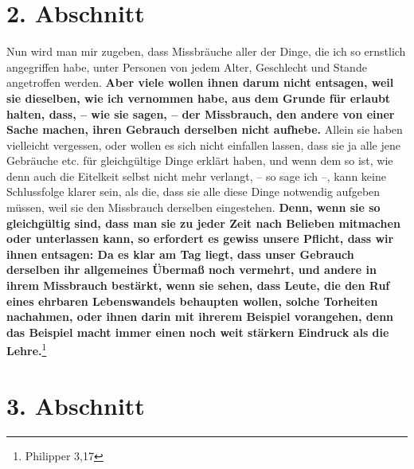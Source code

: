 \section{2. Abschnitt} \label{kap18_ab2}

Nun wird man mir zugeben, dass Missbräuche aller der Dinge, die ich so ernstlich
angegriffen habe, unter Personen von jedem Alter, Geschlecht und Stande
angetroffen werden. \label{ref:18_02_einwand}\textbf{Aber viele wollen ihnen
darum nicht entsagen, weil
sie
dieselben, wie ich vernommen habe, aus dem Grunde für erlaubt halten, dass, --
wie sie sagen, -- der Missbrauch, den andere von einer Sache machen, ihren
Gebrauch derselben nicht aufhebe.} Allein sie haben vielleicht vergessen, oder
wollen es sich nicht einfallen lassen, dass sie ja alle jene Gebräuche etc. für
gleichgültige Dinge erklärt haben, und wenn dem so ist, wie denn auch die
Eitelkeit selbst nicht mehr verlangt, -- so sage ich --, kann keine Schlussfolge
klarer sein, als die, dass sie alle diese Dinge notwendig aufgeben müssen, weil
sie den Missbrauch derselben eingestehen. \textbf{Denn, wenn sie so gleichgültig
sind,
dass man sie zu jeder Zeit nach Belieben mitmachen oder unterlassen kann, so
erfordert es gewiss unsere Pflicht, dass wir ihnen entsagen: Da es klar am Tag
liegt, dass unser Gebrauch derselben ihr allgemeines Übermaß noch vermehrt, und
andere in ihrem Missbrauch bestärkt, wenn sie sehen, dass Leute, die den Ruf
eines ehrbaren Lebenswandels behaupten wollen, solche Torheiten nachahmen, oder
ihnen darin mit ihrerem Beispiel vorangehen, denn das Beispiel macht immer einen
noch weit stärkern Eindruck als die Lehre.}\footnote{Philipper 3,17}

\section{3. Abschnitt} \label{kap18_ab3}

